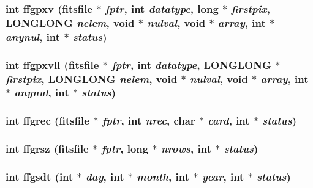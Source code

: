 \subsubsection{\setlength{\rightskip}{0pt plus 5cm}int ffgpxv (\bf{fitsfile} $\ast$ {\em fptr}, int {\em datatype}, long $\ast$ {\em firstpix}, \bf{LONGLONG} {\em nelem}, void $\ast$ {\em nulval}, void $\ast$ {\em array}, int $\ast$ {\em anynul}, int $\ast$ {\em status})}\label{src_2fitsio_8h_bfb2e7a0bf12f295d4907aed0247d9e9}


\subsubsection{\setlength{\rightskip}{0pt plus 5cm}int ffgpxvll (\bf{fitsfile} $\ast$ {\em fptr}, int {\em datatype}, \bf{LONGLONG} $\ast$ {\em firstpix}, \bf{LONGLONG} {\em nelem}, void $\ast$ {\em nulval}, void $\ast$ {\em array}, int $\ast$ {\em anynul}, int $\ast$ {\em status})}\label{src_2fitsio_8h_f79f3c5db73c9029a9adde6aaa91688f}


\subsubsection{\setlength{\rightskip}{0pt plus 5cm}int ffgrec (\bf{fitsfile} $\ast$ {\em fptr}, int {\em nrec}, char $\ast$ {\em card}, int $\ast$ {\em status})}\label{src_2fitsio_8h_bbb72bc1028b323e8ac34baf8e2dc2b4}


\subsubsection{\setlength{\rightskip}{0pt plus 5cm}int ffgrsz (\bf{fitsfile} $\ast$ {\em fptr}, long $\ast$ {\em nrows}, int $\ast$ {\em status})}\label{src_2fitsio_8h_e7f21a30d99f8d7fd38c49d05f0acc62}


\subsubsection{\setlength{\rightskip}{0pt plus 5cm}int ffgsdt (int $\ast$ {\em day}, int $\ast$ {\em month}, int $\ast$ {\em year}, int $\ast$ {\em status})}\label{src_2fitsio_8h_e7df3dbfb42a9a6a6a54e6ed084f5f03}


